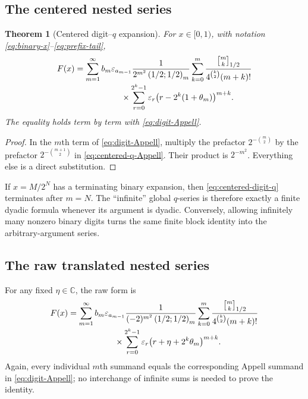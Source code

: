 \documentclass[11pt,oneside]{article}
\newtheorem{theorem}{Theorem}[section]
\theoremstyle{definition}
\theoremstyle{remark}
\newcommand{\C}{\mathbb C}
\newcommand{\eps}{\varepsilon}
\newcommand{\poch}[3]{\left(#1;#2\right)_{#3}}
\newcommand{\qbinom}[3]{\genfrac{[}{]}{0pt}{}{#1}{#2}_{#3}}
\begin{document}
\subsection{The centered nested series}

\begin{theorem}[Centered digit--$q$ expansion]\label{thm:centered-digit-q}
For $x\in[0,1)$, with notation \eqref{eq:binary-x}--\eqref{eq:prefix-tail},
\begin{align}\label{eq:centered-digit-q}
 F(x)
 &=\sum_{m=1}^{\infty}
 b_m\eps_{a_{m-1}}
 \frac1{2^{m^2}\poch{1/2}{1/2}{m}}
 \sum_{k=0}^{m}
 \frac{\qbinom{m}{k}{1/2}}
 {4^{\binom k2}(m+k)!}
 \notag\\[-0.25em]
 &\hspace{5.6em}\times
 \sum_{r=0}^{2^k-1}
 \eps_r\bigl(r-2^k(1+\theta_m)\bigr)^{m+k}.
\end{align}
The equality holds term by term with \eqref{eq:digit-Appell}.
\end{theorem}

\begin{proof}
In the $m$th term of \eqref{eq:digit-Appell}, multiply the prefactor
$2^{-\binom m2}$ by the prefactor
$2^{-\binom{m+1}{2}}$ in \eqref{eq:centered-q-Appell}.  Their product is
$2^{-m^2}$.  Everything else is a direct substitution.
\end{proof}

If $x=M/2^N$ has a terminating binary expansion, then
\eqref{eq:centered-digit-q} terminates after $m=N$.  The ``infinite'' global
$q$-series is therefore exactly a finite dyadic formula whenever its argument
is dyadic.  Conversely, allowing infinitely many nonzero binary digits turns
the same finite block identity into the arbitrary-argument series.

\subsection{The raw translated nested series}

For any fixed $\eta\in\C$, the raw form is
\begin{align}\label{eq:raw-digit-q}
 F(x)
 &=\sum_{m=1}^{\infty}
 b_m\eps_{a_{m-1}}
 \frac1{(-2)^{m^2}\poch{1/2}{1/2}{m}}
 \sum_{k=0}^{m}
 \frac{\qbinom{m}{k}{1/2}}
 {4^{\binom k2}(m+k)!}
 \notag\\[-0.25em]
 &\hspace{5.6em}\times
 \sum_{r=0}^{2^k-1}
 \eps_r\bigl(r+\eta+2^k\theta_m\bigr)^{m+k}.
\end{align}
Again, every individual $m$th summand equals the corresponding Appell summand
in \eqref{eq:digit-Appell}; no interchange of infinite sums is needed to prove
the identity.
\end{document}
